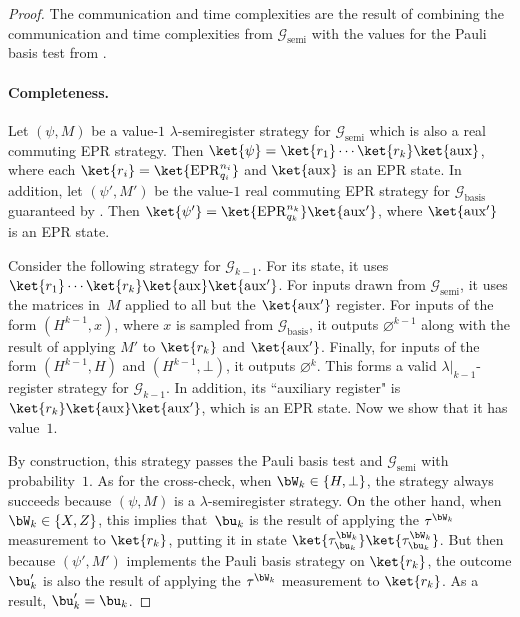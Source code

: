 \documentclass[11pt]{article}
\newcommand{\hideq}{H}
\newcommand{\noop}{\bot}
\newcommand{\shorten}[2]{#1|_{#2}}
\newcommand{\register}{\lambda}
\newcommand{\game}{\mathscr{G}}
\begin{document}
\begin{proof}
The communication and time complexities are the result of combining
the communication and time complexities from $\game_{\mathrm{semi}}$ with the values for the Pauli basis test from .

\paragraph{Completeness.}
Let $(\psi, M)$ be a value-$1$ $\register$-semiregister strategy for $\game_{\mathrm{semi}}$ which is also a real commuting EPR strategy. 
Then $\ket{\psi} = \ket{r_1} \cdots \ket{r_k} \ket{\mathrm{aux}}$, where each $\ket{r_i} = \ket{\mathrm{EPR}_{q_i}^{n_i}}$ and $\ket{\mathrm{aux}}$ is an EPR state.
In addition, let $(\psi', M')$ be the value-$1$ real commuting EPR strategy for $\game_{\mathrm{basis}}$ guaranteed by .
Then $\ket{\psi'} = \ket{\mathrm{EPR}_{q_k}^{n_k}} \ket{\mathrm{aux}'}$, where $\ket{\mathrm{aux}'}$ is an EPR state.

Consider the following strategy for $\game_{k-1}$.
For its state, it uses $\ket{r_1}\cdots \ket{r_k}\ket{\mathrm{aux}}\ket{\mathrm{aux}'}$.
For inputs drawn from $\game_{\mathrm{semi}}$, it uses the matrices in~$M$ applied to all but the $\ket{\mathrm{aux}'}$ register.
For inputs of the form $(H^{k-1}, x)$, where $x$ is sampled from $\game_{\mathrm{basis}}$, it outputs $\varnothing^{k-1}$ along with the result of applying $M'$ to $\ket{r_k}$ and $\ket{\mathrm{aux}'}$.
Finally, for inputs of the form $(H^{k-1}, \hideq)$ and $(H^{k-1}, \noop)$, it outputs $\varnothing^k$.
This forms a valid $\shorten{\register}{k-1}$-register strategy for $\game_{k-1}$.
In addition, its ``auxiliary register" is $\ket{r_k} \ket{\mathrm{aux}}\ket{\mathrm{aux}'}$, which is an EPR state.
Now we show that it has value~$1$.

By construction, this strategy passes the Pauli basis test and $\game_{\mathrm{semi}}$ with probability~$1$.
As for the cross-check, when $\bW_k \in \{\hideq, \noop\}$, the strategy always succeeds because $(\psi, M)$ is a $\register$-semiregister strategy.
On the other hand, when $\bW_k \in \{X, Z\}$, this implies that~$\bu_k$ is the result of applying the $\tau^{\bW_k}$ measurement to $\ket{r_k}$,
putting it in state $\ket{\tau^{\bW_k}_{\bu_k}}\ket{\tau^{\bW_k}_{\bu_k}}$.
But then because $(\psi', M')$ implements the Pauli basis strategy on $\ket{r_k}$, the outcome $\bu_k'$ is also the result of applying the $\tau^{\bW_k}$ measurement to $\ket{r_k}$.
As a result, $\bu_k' = \bu_k$.


\end{proof}
\end{document}
